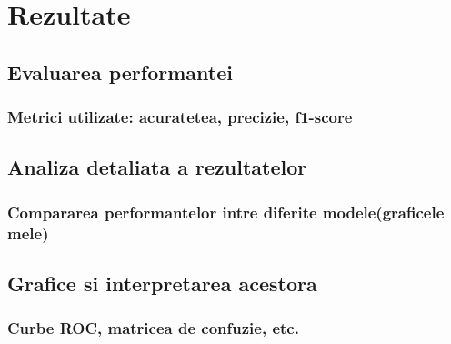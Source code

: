 \chapter{Rezultate}

\section{Evaluarea performantei}
\subsection{Metrici utilizate: acuratetea, precizie, f1-score}

\section{Analiza detaliata a rezultatelor}
\subsection{Compararea performantelor intre diferite modele(graficele mele)}

\section{Grafice si interpretarea acestora}
\subsection{Curbe ROC, matricea de confuzie, etc.}
